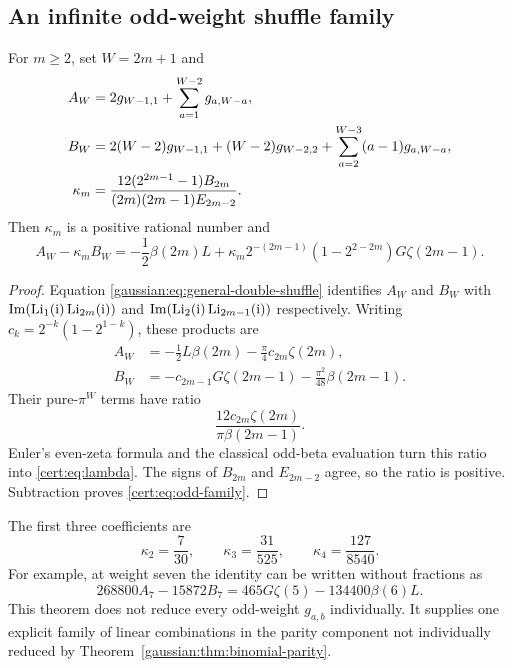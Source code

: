 \subsection{An infinite odd-weight shuffle family}
\begin{theorem}
\label{cert:thm:oddfamily}
For $m\ge2$, set $W=2m+1$ and
\begin{align}
 A_W&=2g_{W-1,1}+\sum_{a=1}^{W-2}g_{a,W-a},\notag\\
 B_W&=2(W-2)g_{W-1,1}+(W-2)g_{W-2,2}
       +\sum_{a=2}^{W-3}(a-1)g_{a,W-a},\label{cert:eq:AB}\\
 \kappa_m&=\frac{12(2^{2m-1}-1)B_{2m}}
                   {(2m)(2m-1)E_{2m-2}}.\label{cert:eq:lambda}
\end{align}
Then $\kappa_m$ is a positive rational number and
\begin{equation}
 A_W-\kappa_m B_W
 =-\frac12\beta(2m)L+
 \kappa_m 2^{-(2m-1)}(1-2^{2-2m})G\zeta(2m-1).
\label{cert:eq:odd-family}
\end{equation}
\end{theorem}
\begin{proof}
Equation \eqref{gaussian:eq:general-double-shuffle} identifies $A_W$ and $B_W$ with
$\operatorname{Im}(\operatorname{Li}_1(\mathrm{i})\operatorname{Li}_{2m}(\mathrm{i}))$ and
$\operatorname{Im}(\operatorname{Li}_2(\mathrm{i})\operatorname{Li}_{2m-1}(\mathrm{i}))$ respectively.
Writing $c_k=2^{-k}(1-2^{1-k})$, these products are
\begin{align*}
 A_W&=-\tfrac12 L\beta(2m)-\tfrac\pi4 c_{2m}\zeta(2m),\\
 B_W&=-c_{2m-1}G\zeta(2m-1)-\tfrac{\pi^2}{48}\beta(2m-1).
\end{align*}
Their pure-$\pi^W$ terms have ratio
\[
 \frac{12c_{2m}\zeta(2m)}{\pi\beta(2m-1)}.
\]
Euler's even-zeta formula and the classical odd-beta evaluation turn this ratio into
\eqref{cert:eq:lambda}. The signs of $B_{2m}$ and $E_{2m-2}$ agree, so the
ratio is positive. Subtraction proves \eqref{cert:eq:odd-family}.
\end{proof}

The first three coefficients are
\[
 \kappa_2=\frac7{30},\qquad
 \kappa_3=\frac{31}{525},\qquad
 \kappa_4=\frac{127}{8540}.
\]
For example, at weight seven the identity can be written without
fractions as
\begin{equation}
 268800A_7-15872B_7=465G\zeta(5)-134400\beta(6)L.
\label{cert:eq:odd7}
\end{equation}
This theorem does not reduce every odd-weight $g_{a,b}$ individually.
It supplies one explicit family of linear combinations in the parity
component not individually reduced by Theorem~\ref{gaussian:thm:binomial-parity}.


